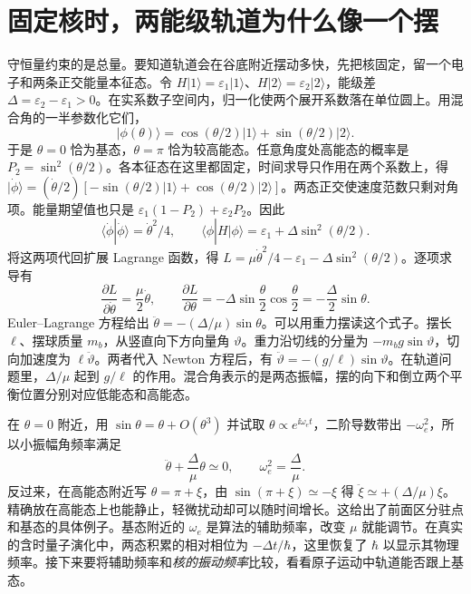 \section{固定核时，两能级轨道为什么像一个摆}
守恒量约束的是总量。要知道轨道会在谷底附近摆动多快，先把核固定，留一个电子和两条正交能量本征态。令 $H|1\rangle=\varepsilon_1|1\rangle$、$H|2\rangle=\varepsilon_2|2\rangle$，能级差 $\Delta=\varepsilon_2-\varepsilon_1>0$。在实系数子空间内，归一化使两个展开系数落在单位圆上。用混合角的一半参数化它们，
\[
 |\phi(\theta)\rangle=\cos(\theta/2)|1\rangle+\sin(\theta/2)|2\rangle .
\]
于是 $\theta=0$ 恰为基态，$\theta=\pi$ 恰为较高能态。任意角度处高能态的概率是 $P_2=\sin^2(\theta/2)$。各本征态在这里都固定，时间求导只作用在两个系数上，得 $|\dot\phi\rangle=(\dot\theta/2)[-\sin(\theta/2)|1\rangle+\cos(\theta/2)|2\rangle]$。两态正交使速度范数只剩对角项。能量期望值也只是 $\varepsilon_1(1-P_2)+\varepsilon_2P_2$。因此
\begin{equation}
\langle\dot\phi|\dot\phi\rangle=\dot\theta^2/4,\qquad
\langle\phi|H|\phi\rangle=\varepsilon_1+\Delta\sin^2(\theta/2).
\end{equation}
将这两项代回扩展 Lagrange 函数，得 $L=\mu\dot\theta^2/4-\varepsilon_1-\Delta\sin^2(\theta/2)$。逐项求导有
\begin{equation}
\frac{\partial L}{\partial\dot\theta}=\frac\mu2\dot\theta,\qquad
\frac{\partial L}{\partial\theta}=-\Delta\sin\frac\theta2\cos\frac\theta2
=-\frac\Delta2\sin\theta.
\end{equation}
Euler--Lagrange 方程给出 $\ddot\theta=-(\Delta/\mu)\sin\theta$。可以用重力摆读这个式子。摆长 $\ell$、摆球质量 $m_b$，从竖直向下方向量角 $\vartheta$。重力沿切线的分量为 $-m_b g\sin\vartheta$，切向加速度为 $\ell\ddot\vartheta$。两者代入 Newton 方程后，有 $\ddot\vartheta=-(g/\ell)\sin\vartheta$。在轨道问题里，$\Delta/\mu$ 起到 $g/\ell$ 的作用。混合角表示的是两态振幅，摆的向下和倒立两个平衡位置分别对应低能态和高能态。

在 $\theta=0$ 附近，用 $\sin\theta=\theta+O(\theta^3)$ 并试取 $\theta\propto e^{\ii\omega_e t}$，二阶导数带出 $-\omega_e^2$，所以小振幅角频率满足
\begin{equation}\label{cp:electronic-frequency}
 \ddot\theta+\frac{\Delta}{\mu}\theta\simeq0,\qquad \omega_e^2=\frac{\Delta}{\mu}.
\end{equation}
反过来，在高能态附近写 $\theta=\pi+\xi$，由 $\sin(\pi+\xi)\simeq-\xi$ 得 $\ddot\xi\simeq+(\Delta/\mu)\xi$。精确放在高能态上也能静止，轻微扰动却可以随时间增长。这给出了前面区分驻点和基态的具体例子。基态附近的 $\omega_e$ 是算法的辅助频率，改变 $\mu$ 就能调节。在真实的含时量子演化中，两态积累的相对相位为 $-\Delta t/\hbar$，这里恢复了 $\hbar$ 以显示其物理频率。接下来要将辅助频率和\emph{核的振动频率}比较，看看原子运动中轨道能否跟上基态。

